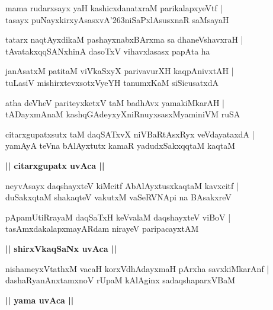 \documentclass[twoside,12pt,openright]{book}
\def\S{\char'263}
\newcounter{shloka}[chapter]
\def\uvaca#1{\centerline{{\large\textbf{#1}}}}
\begin{document}
\begin{shloka}%
mama rudarxsayx yaH kashicxdanatxraM parikalapxyeVtf |\\
tasayx puNayxkirxyAsasxvA\S niSaPxlAsusxnaR saMsayaH 
\end{shloka}

\begin{shloka}%
tatarx naqtAyxdikaM pashayxnabxBArxma sa dhaneVshavxraH |\\
tAvatakxqqSANxhinA dasoTxV vihavxlasasx papAta ha 
\end{shloka}

\begin{shloka}%
janAsatxM patitaM viVkaSxyX parivavurXH kaqpAnivxtAH |\\
tuLasiV mishirxtevxsotxVyeYH tanumxKaM siSicusatxdA 
\end{shloka}

\begin{shloka}%
atha deVheV pariteyxketxV taM badhAvx yamakiMkarAH |\\
tADayxmAnaM kashqGAdeyxyXniRnuyxsasxMyaminiVM ruSA 
\end{shloka}

\begin{shloka}%
citarxgupatxsutx taM daqSATxvX niVBaRtAsxRyx veVdayataxdA |\\
yamAyA teVna bAlAyxtutx kamaR yadudxSakxqqtaM kaqtaM 
\end{shloka}

\uvaca{|| citarxgupatx uvAca ||}

\begin{shloka}%
neyvAsayx daqshayxteV kiMcitf AbAlAyxtusxkaqtaM kavxcitf |\\
duSakxqtaM shakaqteV vakutxM vaSeRVNApi na BAsakxreV 
\end{shloka}

\begin{shloka}%
pApamUtiRrayaM daqSaTxH keVvalaM daqshayxteV viBoV |\\
tasAmxdakalapxmayARdam nirayeV paripacayxtAM 
\end{shloka}

\uvaca{|| shirxVkaqSaNx uvAca ||}

\begin{shloka}%
nishameyxVtathxM vacaH korxVdhAdayxmaH pArxha savxkiMkarAnf |\\
dashaRyanAnxtamxnoV rUpaM kAlAginx sadaqshaparxVBaM
\end{shloka}

\uvaca{|| yama uvAca ||}
\end{document}
